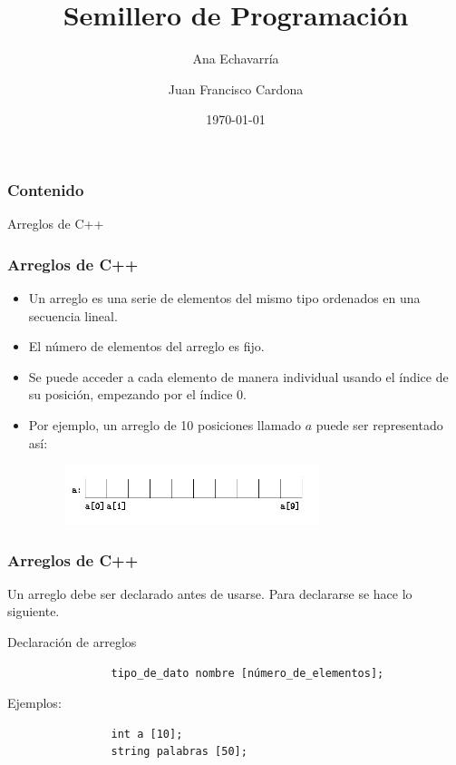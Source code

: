 \documentclass{beamer}
\title{Semillero de Programación}
\author{Ana Echavarría \and Juan Francisco Cardona}
\institute{Universidad EAFIT}
\date{\today}
\begin{document}
\begin{frame}
	\titlepage
\end{frame}

\begin{frame}
	\frametitle{Contenido}
	\tableofcontents
\end{frame}


\begin{section}{Arreglos de C++}
	\begin{frame}[fragile]
		\frametitle{Arreglos de C++}
		\begin{itemize}
			\item{Un arreglo es una serie de elementos del mismo tipo ordenados en una secuencia lineal.}
			\item{El número de elementos del arreglo es fijo.}
			\item{Se puede acceder a cada elemento de manera individual usando el índice de su posición, empezando por el índice 0.}
			\item{Por ejemplo, un arreglo de 10 posiciones llamado $a$ puede ser representado así:}
			\begin{figure}
				\includegraphics[width = 0.7\textwidth]{arreglo.jpg}
			\end{figure}			
		\end{itemize}
	\end{frame}
	
	\begin{frame}[fragile]
		\frametitle{Arreglos de C++}
		Un arreglo debe ser declarado antes de usarse. Para declararse se hace lo siguiente.
		\begin{block}{Declaración de arreglos}
			\begin{verbatim}
				tipo_de_dato nombre [número_de_elementos];
			\end{verbatim}
			Ejemplos:\\
			\begin{verbatim}
				int a [10];
				string palabras [50];
			\end{verbatim}			
		\end{block}		
	\end{frame}
	

\end{section}
\end{document}
